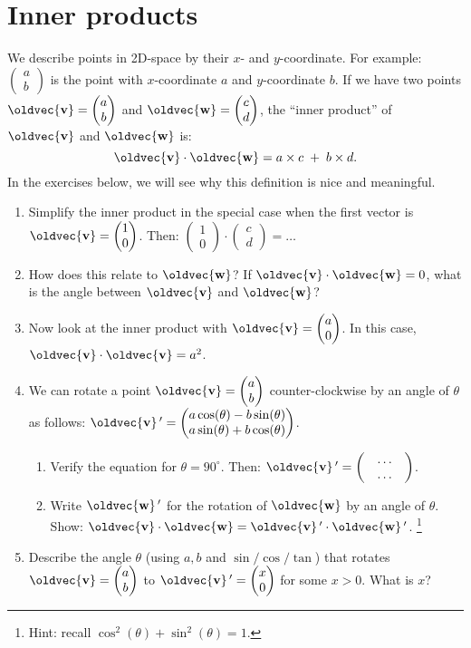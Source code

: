 \documentclass[10pt,a4paper]{article}
\newcommand{\twovec}[2]{\ensuremath{\begin{pmatrix}{#1}\\{#2}\end{pmatrix}}}
\renewcommand{\vec}[1]{\oldvec{\mathbf{#1}}}
\begin{document}
\section{Inner products}
We describe points in 2D-space by their \(x\)- and \(y\)-coordinate.
For example: \(\twovec{a}{b}\) is the point with \(x\)-coordinate \(a\) and \(y\)-coordinate \(b\).
If we have two points \(\vec{v} = \twovec{a}{b}\) and \(\vec{w} = \twovec{c}{d}\),
	the ``inner product'' of \(\vec{v}\) and \(\vec{w}\) is:
\[\vec{v} \cdot \vec{w} = a \times c \;+\; b \times d.\]
In the exercises below, we will see why this definition is nice and meaningful.

\begin{enumerate}
\item Simplify the inner product in the special case when the first vector is \( \vec{v} = \twovec{1}{0}\).
	Then: \(\twovec{1}{0} \cdot \twovec{c}{d} = \ldots\)
	\begin{figure}[h!]
		\centering{}
	\end{figure}

\item How does this relate to \(\vec{w}\)? If \(\vec{v} \cdot \vec{w} = 0\), what is the angle between \(\vec{v}\) and \(\vec{w}\)?

\item Now look at the inner product with \( \vec{v} = \twovec{a}{0}\).
	In this case, \(\vec{v} \cdot \vec{v} = a^2\).

\item We can rotate a point \(\vec{v} = \twovec{a}{b}\) counter-clockwise by an angle of \(\theta\)
	as follows: \(\vec{v}\,' = \twovec{a \cos(\theta) - b \sin(\theta)}{a \sin(\theta) + b \cos(\theta)}\).\\[-1em]
	\begin{enumerate}
	\item Verify the equation for \(\theta = 90^\circ\).
		Then: \(\vec{v}\,' = \twovec{\quad\ldots\quad}{\quad\ldots\quad}\).

	\item Write \(\vec{w}\,'\) for the rotation of \(\vec{w}\) by an angle of \(\theta\).
		Show: \(\vec{v} \cdot \vec{w} = \vec{v}\,' \cdot \vec{w}\,'\).%
		\footnote{Hint: recall \(\cos^2(\theta) + \sin^2(\theta) = 1\).}
	\end{enumerate}

	\begin{figure}[h!]
		\centering{}
	\end{figure}
\item Describe the angle \(\theta\) (using \(a, b\) and \(\sin/\cos/\tan\)) that rotates \(\vec{v} = \twovec{a}{b}\) to \(\vec{v}\,' = \twovec{x}{0}\) for some \(x > 0\).
	What is \(x\)?


\end{enumerate}
\end{document}
